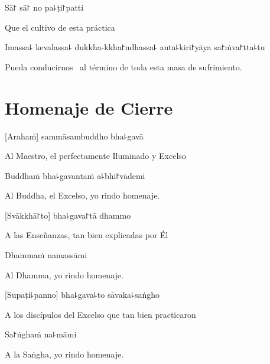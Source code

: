 Sā꜓ sā꜓ no pa꜕ṭi꜓patti

\begin{english}
  Que el cultivo de esta práctica
\end{english}

Imassa꜕ kevalassa꜕ dukkha-kkha꜓ndhassa꜕ anta꜕kiri꜓yāya sa꜓ṁva꜓tta꜕tu

\begin{english}
 Pueda conducirnos  \pause\  al término de toda esta masa de sufrimiento.
\end{english}

\clearpage

\chapter{Homenaje de Cierre}

[Arahaṁ] sammāsambuddho bha꜕gavā

\begin{english}
  Al Maestro, el perfectamente Iluminado y Excelso 
\end{english}

Buddhaṁ bha꜕gavantaṁ a꜕bhi꜓vādemi

\begin{english}
  Al Buddha, el Excelso, yo rindo homenaje.
\end{english}

[Svākkhā꜓to] bha꜕gava꜓tā dhammo

\begin{english}
  A las Enseñanzas, tan bien explicadas por Él 
\end{english}

Dhammaṁ namassāmi

\begin{english}
  Al Dhamma, yo rindo homenaje.
\end{english}


[Supaṭi꜕panno] bha꜕gava꜕to sāvaka꜕saṅgho

\begin{english}
  A los discípulos del Excelso que tan bien practicaron
\end{english}

Sa꜓ṅghaṁ na꜕māmi

\begin{english}
  A la Saṅgha, yo rindo homenaje.
\end{english}
